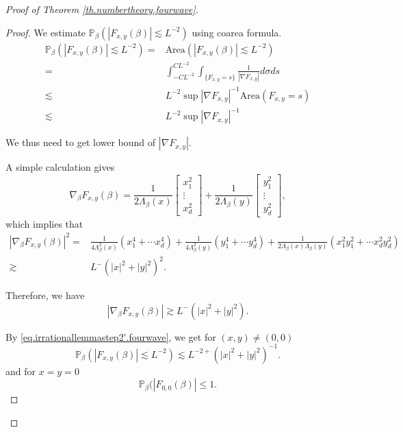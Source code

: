 \begin{proof}[Proof of Theorem \ref{th.numbertheory.fourwave}]
\begin{proof}
We estimate $\mathbb{P}_{\beta}(|F_{x,y}(\beta)|\lesssim L^{-2})$ using coarea formula. 
\begin{equation}\label{eq.irrationallemmastep2'.fourwave}
\begin{split}
    \mathbb{P}_{\beta}(|F_{x,y}(\beta)|\lesssim L^{-2})=&\text{Area}(|F_{x,y}(\beta)|\lesssim L^{-2})
    \\
    =& \int^{CL^{-2}}_{-CL^{-2}} \int_{\{F_{x,y}=s\}}\frac{1}{|\nabla F_{x,y}|}d\sigma ds
    \\
    \lesssim& L^{-2} \sup |\nabla F_{x,y}|^{-1} \text{Area}(F_{x,y}=s)
    \\
    \lesssim& L^{-2} \sup |\nabla F_{x,y}|^{-1}
\end{split}
\end{equation}

We thus need to get lower bound of $|\nabla F_{x,y}|$.

A simple calculation gives
\begin{equation}
    \nabla_{\beta} F_{x,y}(\beta)=\frac{1}{2\Lambda_{\beta}(x)}\begin{bmatrix} x_1^2\\\vdots\\x_d^2
    \end{bmatrix}+\frac{1}{2\Lambda_{\beta}(y)}\begin{bmatrix} y_1^2\\\vdots\\y_d^2
    \end{bmatrix},
\end{equation}
which implies that 
\begin{equation}
\begin{split}
    |\nabla_{\beta} F_{x,y}(\beta)|^2=&\frac{1}{4\Lambda^2_{\beta}(x)} (x_1^4+\cdots x_d^4) +\frac{1}{4\Lambda^2_{\beta}(y)} (y_1^4+\cdots y_d^4)+\frac{1}{2\Lambda_{\beta}(x)\Lambda_{\beta}(y)} (x_1^2y_1^2+\cdots x_d^2y_d^2)
    \\
    \gtrsim& L^{-} (|x|^2+|y|^2)^2.
\end{split}
\end{equation}

Therefore, we have 
\begin{equation}
    |\nabla_{\beta} F_{x,y}(\beta)|\gtrsim L^{-} (|x|^2+|y|^2).
\end{equation}

By \eqref{eq.irrationallemmastep2'.fourwave}, we get for $(x,y)\ne (0,0)$
\begin{equation}
    \mathbb{P}_{\beta}(|F_{x,y}(\beta)|\lesssim L^{-2})\lesssim L^{-2+} (|x|^2+|y|^2)^{-1}.
\end{equation}
and for $x=y=0$
\begin{equation}
    \mathbb{P}_{\beta}(|F_{0,0}(\beta)|\le 1.
\end{equation}


\end{proof}
\end{proof}

